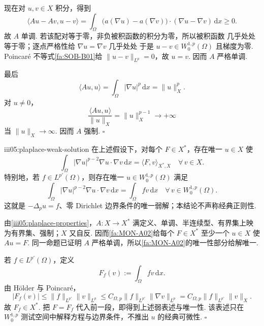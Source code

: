 \begin{FAProof}
现在对 \(\displaystyle u,v\in X\) 积分，得到
\[
\langle Au-Av,u-v\rangle
=
\int_\Omega
\bigl(a(\nabla u)-a(\nabla v)\bigr)
\cdot
(\nabla u-\nabla v)
\,\mathrm{d}x
\geqslant0.
\]
故 \(\displaystyle A\) 单调. 若该配对等于零，非负被积函数的积分为零，所以被积函数 几乎处处 等于零；逐点严格性给 \(\displaystyle\nabla u=\nabla v\) 几乎处处 于是 \(\displaystyle u-v\in W_0^{1,p}(\Omega)\) 且梯度为零. Poincaré 不等式\autoref{fa:SOB-B01}给 \(\displaystyle\|u-v\|_{L^p}=0\)，故 \(\displaystyle u=v\). 因而 \(\displaystyle A\) 严格单调.

最后
\[
\langle Au,u\rangle
=
\int_\Omega|\nabla u|^p\,\mathrm{d}x
=
\|u\|_X^p.
\]
对 \(\displaystyle u\neq0\)，
\[
\frac{\langle Au,u\rangle}{\|u\|_X}
=
\|u\|_X^{p-1}
\longrightarrow+\infty
\]
当 \(\displaystyle\|u\|_X\to\infty\). 因而 \(\displaystyle A\) 强制.
\hfill\(\square\)
\end{FAProof}

\begin{FATheorem}{iii05:plaplace-weak-solution}
在上述假设下，对每个 \(\displaystyle F\in X^*\)，存在唯一 \(\displaystyle u\in X\) 使
\[
\int_\Omega
|\nabla u|^{p-2}\nabla u\cdot\nabla v
\,\mathrm{d}x
=
\langle F,v\rangle_{X^*,X}
\quad\forall\,v\in X.
\]
特别地，若 \(\displaystyle f\in L^{p'}(\Omega)\)，则存在唯一 \(\displaystyle u\in W_0^{1,p}(\Omega)\) 满足
\[
\int_\Omega
|\nabla u|^{p-2}\nabla u\cdot\nabla v
\,\mathrm{d}x
=
\int_\Omega fv\,\mathrm{d}x
\quad\forall\,v\in W_0^{1,p}(\Omega).
\]
这就是 \(\displaystyle-\Delta_pu=f\)、零 Dirichlet 边界条件的唯一弱解；本结论不声称经典正则性.
\end{FATheorem}

\begin{FAProof}
由\autoref{iii05:plaplace-properties}，\(\displaystyle A:X\to X^*\) 满定义、单调、半连续型、有界集上映为有界集、强制；\(\displaystyle X\) 又自反. 因而\autoref{fa:MON-A02}给每个 \(\displaystyle F\in X^*\) 至少一个 \(\displaystyle u\in X\) 使 \(\displaystyle Au=F\). 同一命题已证明 \(\displaystyle A\) 严格单调，所以\autoref{fa:MON-A02}的唯一性部分给解唯一.

若 \(\displaystyle f\in L^{p'}(\Omega)\)，定义
\[
F_f(v)
:=
\int_\Omega fv\,\mathrm{d}x.
\]
由 Hölder 与 Poincaré，
\[
|F_f(v)|
\leqslant
\|f\|_{L^{p'}}\|v\|_{L^p}
\leqslant
C_{\Omega,p}\|f\|_{L^{p'}}\|\nabla v\|_{L^p}
=
C_{\Omega,p}\|f\|_{L^{p'}}\|v\|_X.
\]
故 \(\displaystyle F_f\in X^*\). 把 \(\displaystyle F=F_f\) 代入前一段，即得到上述弱表述与唯一性. 该表述只在 \(\displaystyle W_0^{1,p}\) 测试空间中解释方程与边界条件，不推出 \(\displaystyle u\) 的经典可微性.
\hfill\(\square\)
\end{FAProof}


